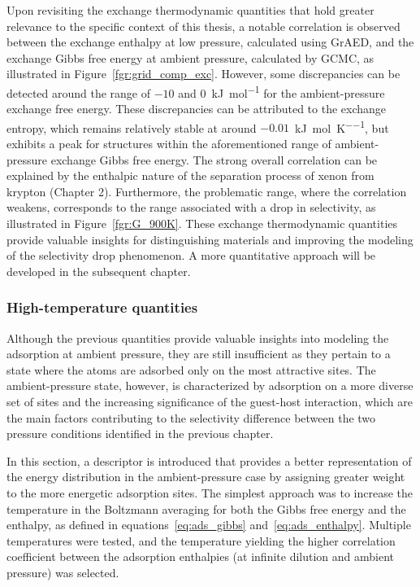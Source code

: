 \documentclass[main]{subfiles}
\begin{document}
Upon revisiting the exchange thermodynamic quantities that hold greater relevance to the specific context of this thesis, a notable correlation is observed between the exchange enthalpy at low pressure, calculated using GrAED, and the exchange Gibbs free energy at ambient pressure, calculated by GCMC, as illustrated in Figure~\ref{fgr:grid_comp_exc}. However, some discrepancies can be detected around the range of $-10$ and $0$~\si{\kilo\joule\per\mole} for the ambient-pressure exchange free energy. These discrepancies can be attributed to the exchange entropy, which remains relatively stable at around $-0.01$~\si{\kilo\joule\per\mole\per\kelvin}, but exhibits a peak for structures within the aforementioned range of ambient-pressure exchange Gibbs free energy. The strong overall correlation can be explained by the enthalpic nature of the separation process of xenon from krypton (Chapter 2). Furthermore, the problematic range, where the correlation weakens, corresponds to the range associated with a drop in selectivity, as illustrated in Figure~\ref{fgr:G_900K}. These exchange thermodynamic quantities provide valuable insights for distinguishing materials and improving the modeling of the selectivity drop phenomenon. A more quantitative approach will be developed in the subsequent chapter.


\subsubsection{High-temperature quantities}

Although the previous quantities provide valuable insights into modeling the adsorption at ambient pressure, they are still insufficient as they pertain to a state where the atoms are adsorbed only on the most attractive sites. The ambient-pressure state, however, is characterized by adsorption on a more diverse set of sites and the increasing significance of the guest-host interaction, which are the main factors contributing to the selectivity difference between the two pressure conditions identified in the previous chapter.

In this section, a descriptor is introduced that provides a better representation of the energy distribution in the ambient-pressure case by assigning greater weight to the more energetic adsorption sites. The simplest approach was to increase the temperature in the Boltzmann averaging for both the Gibbs free energy and the enthalpy, as defined in equations~\ref{eq:ads_gibbs} and~\ref{eq:ads_enthalpy}. Multiple temperatures were tested, and the temperature yielding the higher correlation coefficient between the adsorption enthalpies (at infinite dilution and ambient pressure) was selected.
\end{document}

